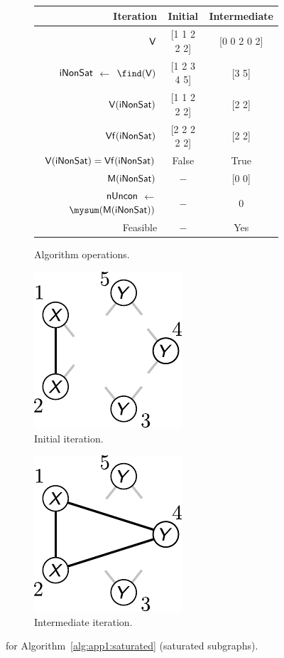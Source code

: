 \begin{figure}[!ht]

\begin{subfigure}[b]{\textwidth}
\centering
\begin{tabular}{r | c | c}
 Iteration & Initial & Intermediate \\
 \hline 
 $\textup{\textsf{V}}$ & [1 1 2 2 2] & [0 0 2 0 2] \\
 $\textup{\textsf{iNonSat}}$ $\leftarrow$ $\find(\xvar{V})$ & [1 2 3 4 5] & [3 5] \\
 $\textup{\textsf{V}}(\textup{\textsf{iNonSat}})$ & [1 1 2 2 2] & [2 2] \\
 $\textup{\textsf{Vf}}(\textup{\textsf{iNonSat}})$ & [2 2 2 2 2] & [2 2] \\
 $\textup{\textsf{V}}(\textup{\textsf{iNonSat}}) = \textup{\textsf{Vf}}(\textup{\textsf{iNonSat}})$ & False & True \\
 $\textup{\textsf{M}}(\textup{\textsf{iNonSat}})$ & $-$ & [0 0] \\
 $\textup{\textsf{nUncon}}$ $\leftarrow$ $\mysum(\xvar{M}(\xvar{iNonSat}))$ & $-$ & 0 \\
 Feasible & $-$ & Yes
\end{tabular}
\caption{Algorithm operations.\label{tb:app1:saturated-ex1-V}}
\end{subfigure}%

\begin{subfigure}[b]{0.5\textwidth}
\centering
\includegraphics[scale=1]{../app1/fig/saturated-ex1-original_v2}
\caption{Initial iteration.\label{fig:app1:saturated-ex1-original}}
\end{subfigure}%
\begin{subfigure}[b]{0.5\textwidth}
\centering
 \includegraphics[scale=1]{../app1/fig/saturated-ex1-intermediate_v2}
 \caption{Intermediate iteration.\label{fig:app1:saturated-ex1-intermediate}}
\end{subfigure}%

\caption{ for Algorithm~\ref{alg:app1:saturated} (saturated subgraphs).}
\end{figure}

